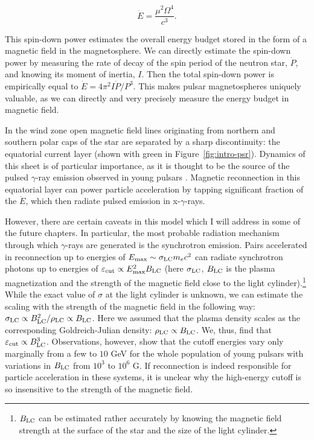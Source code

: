\begin{equation}
    \dot{E} = \frac{\mu^2 \Omega^4}{c^3}.
\end{equation}

\noindent This spin-down power estimates the overall energy budget stored in the form of a magnetic field in the magnetosphere. We can directly estimate the spin-down power by measuring the rate of decay of the spin period of the neutron star, $\dot{P}$, and knowing its moment of inertia, $I$. Then the total spin-down power is empirically equal to $\dot{E} = 4\pi^2 I \dot{P}/P^3$. This makes pulsar magnetospheres uniquely valuable, as we can directly and very precisely measure the energy budget in magnetic field.

In the wind zone open magnetic field lines originating from northern and southern polar caps of the star are separated by a sharp discontinuity: the equatorial current layer (shown with green in Figure~\ref{fig:intro-psr}). Dynamics of this sheet is of particular importance, as it is thought to be the source of the pulsed $\gamma$-ray emission observed in young pulsars \citep{1996A&A...311..172L,2010ApJ...715.1282B,2010MNRAS.404..767C,2011ASSP...21..165A,2012MNRAS.424.2023P,2015MNRAS.448..606C}. Magnetic reconnection in this equatorial layer can power particle acceleration by tapping significant fraction of the $\dot{E}$, which then radiate pulsed emission in x-$\gamma$-rays.

However, there are certain caveats in this model which I will address in some of the future chapters. In particular, the most probable radiation mechanism through which $\gamma$-rays are generated is the synchrotron emission. Pairs accelerated in reconnection up to energies of $E_{\rm max}\sim \sigma_{\rm LC} m_e c^2$ can radiate synchrotron photons up to energies of $\varepsilon_{\rm cut} \propto E_{\rm max}^2 B_{\rm LC}$ (here $\sigma_{\rm LC}$, $B_{\rm LC}$ is the plasma magnetization and the strength of the magnetic field close to the light cylinder).\footnote{$B_{\rm LC}$ can be estimated rather accurately by knowing the magnetic field strength at the surface of the star and the size of the light cylinder.} While the exact value of $\sigma$ at the light cylinder is unknown, we can estimate the scaling with the strength of the magnetic field in the following way: $\sigma_{\rm LC}\propto B_{\rm LC}^2 / \rho_{\rm LC}\propto B_{\rm LC}$. Here we assumed that the plasma density scales as the corresponding Goldreich-Julian density: $\rho_{\rm LC} \propto B_{\rm LC}$. We, thus, find that $\varepsilon_{\rm cut} \propto B_{\rm LC}^3$. Observations, however, show that the cutoff energies vary only marginally from a few to $10$ GeV for the whole population of young pulsars with variations in $B_{\rm LC}$ from $10^3$ to $10^6$ G. If reconnection is indeed responsible for particle acceleration in these systems, it is unclear why the high-energy cutoff is so insensitive to the strength of the magnetic field. 

